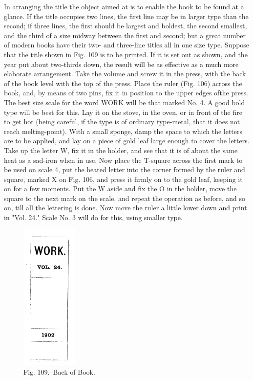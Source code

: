 \documentclass[twoside]{book}
\begin{document}
In arranging the title the object aimed at is
to enable the book to be found at a glance. If
the title occupies two lines, the first line may be
in larger type than the second; if three lines, the
first should be largest and boldest, the second smallest,
and the third of a size midway between the first
and second; but a great number of modern books
have their two- and three-line titles all in one size
type. Suppose that the title shown in Fig. 109 is
to be printed. If it is set out as shown, and the
year put about two-thirds down, the result will be
as effective as a much more elaborate arrangement.
Take the volume and screw it in the press, with
the back of the book level with the top of the press.
Place the ruler (Fig. 106) across the book, and, by
means of two pins, fix it in position to the upper
edges ofthe press. The best size scale for the word
WORK will be that marked No. 4. A good bold type
will be best for this. Lay it on the stove, in the
oven, or in front of the fire to get hot (being careful,
if the type is of ordinary type-metal, that it does
not reach melting-point). With a small sponge,
damp the space to which the letters are to be
applied, and lay on a piece of gold leaf large enough
to cover the letters. Take up the letter W, fix it
in the holder, and see that it is of about the same
heat as a sad-iron when in use. Now place the
T-square across the first mark to be used on scale 4,
put the heated letter into the corner formed by the
\pagebreak
ruler and square, marked X on Fig. 106, and press it
firmly on to the gold leaf, keeping it on for a few
moments. Put the W aside and fix the O in the
holder, move the square to the next mark on the
scale, and repeat the operation as before, and so
on, till all the lettering is done. Now move the
ruler a little lower down and print in "Vol. 24."
Scale No. 3 will do for this, using smaller type.
	\begin{figure}[h]
		\centering
		\includegraphics[width=0.25\textwidth]{Figures/_109.png}
		\caption*{Fig. 109.--Back of Book.}
	\end{figure}
\end{document}
